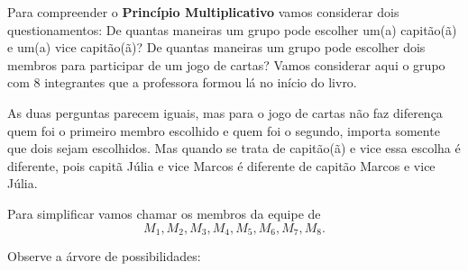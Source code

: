 Para compreender o \textbf{Princípio Multiplicativo} vamos considerar dois questionamentos: De quantas maneiras um grupo pode escolher um(a) capitão(ã) e um(a) vice capitão(ã)? De quantas maneiras um grupo pode escolher dois membros para participar de um jogo de cartas? Vamos considerar aqui o grupo com 8 integrantes que a professora formou lá no início do livro. 

As duas perguntas parecem iguais, mas para o jogo de cartas não faz diferença quem foi o primeiro membro escolhido e quem foi o segundo, importa somente que dois sejam escolhidos. Mas quando se trata de capitão(ã) e vice essa escolha é diferente, pois capitã Júlia e vice Marcos é diferente de capitão Marcos e vice Júlia. 

Para simplificar vamos chamar os membros da equipe de 
$$M_1, M_2, M_3, M_4, M_5, M_6, M_7, M_8.$$

Observe a árvore de possibilidades: 


